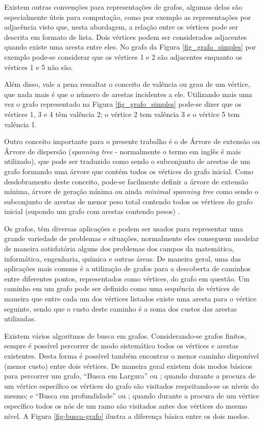 Existem outras convenções para representações de grafos, algumas delas são especialmente úteis para computação, como por exemplo as representações por adjacência visto que, nesta abordagem, a relação entre os vértices pode ser descrita em formato de lista. Dois vértices podem ser considerados adjacentes quando existe uma aresta entre eles. No grafo da Figura \ref{fig_grafo_simples} por exemplo pode-se considerar que os vértices 1 e 2 são adjacentes enquanto os vértices 1 e 5 não são.

Além disso, vale a pena ressaltar o conceito de valência ou grau de um vértice, que nada mais é que o número de arestas incidentes a ele. Utilizando mais uma vez o grafo representado na Figura \ref{fig_grafo_simples} pode-se dizer que os vértices 1, 3 e 4 têm valência 2; o vértice 2 tem valência 3 e o vértice 5 tem valência 1.

Outro conceito importante para o presente trabalho é o de Árvore de extensão ou Árvore de dispersão (\emph{spanning tree} - normalmente o termo em inglês é mais utilizado), que pode ser traduzido como sendo o subconjunto de arestas de um grafo formando uma árvore que contém todos os vértices do grafo inicial. Como desdobramento deste conceito, pode-se facilmente definir a árvore de extensão mínima, árvore de geração mínima ou ainda \emph{minimal spanning tree} como sendo o subconjunto de arestas de menor peso total contendo todos os vértices do grafo inicial (supondo um grafo com arestas contendo pesos) \cite{Eppstein1996}.

Os grafos, têm diversas aplicações e podem ser usados para representar uma grande variedade de problemas e situações, normalmente eles conseguem modelar de maneira satisfatória alguns dos problemas dos campos da matemática, informática, engenharia, química e outras áreas. De maneira geral, uma das aplicações mais comuns é a utilização de grafos para a descoberta de caminhos entre diferentes pontos, representados como vértices, do grafo em questão. Um caminho em um grafo pode ser definido como uma sequência de vértices de maneira que entre cada um dos vértices listados existe uma aresta para o vértice seguinte, sendo que o custo deste caminho é a soma dos custos das arestas utilizadas.

Existem vários algoritmos de busca em grafos. Considerando-se grafos finitos, sempre é possível percorrer de modo sistemático todos os vértices e arestas existentes. Desta forma é possível também encontrar o menor caminho disponível (menor custo) entre dois vértices. De maneira geral existem dois modos básicos para percorrer um grafo, ``Busca em Largura'' ou ; quando durante a procura de um vértice específico os vértices do grafo são visitados respeitando-se os níveis do mesmo;  e ``Busca em profundidade'' ou ; quando durante a procura de um vértice específico todos os nós de um ramo são visitados antes dos vértices do mesmo nível. A Figura \ref{fig-busca-grafo} ilustra a diferença básica entre os dois modos.

